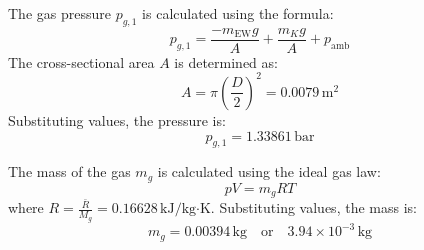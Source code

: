 The gas pressure \( p_{g,1} \) is calculated using the formula:  
\[
p_{g,1} = \frac{-m_{\text{EW}} g}{A} + \frac{m_K g}{A} + p_{\text{amb}}
\]  
The cross-sectional area \( A \) is determined as:  
\[
A = \pi \left(\frac{D}{2}\right)^2 = 0.0079 \, \text{m}^2
\]  
Substituting values, the pressure is:  
\[
p_{g,1} = 1.33861 \, \text{bar}
\]  

The mass of the gas \( m_g \) is calculated using the ideal gas law:  
\[
p V = m_g R T
\]  
where \( R = \frac{\bar{R}}{M_g} = 0.16628 \, \text{kJ/kg·K} \).  
Substituting values, the mass is:  
\[
m_g = 0.00394 \, \text{kg} \quad \text{or} \quad 3.94 \times 10^{-3} \, \text{kg}
\]